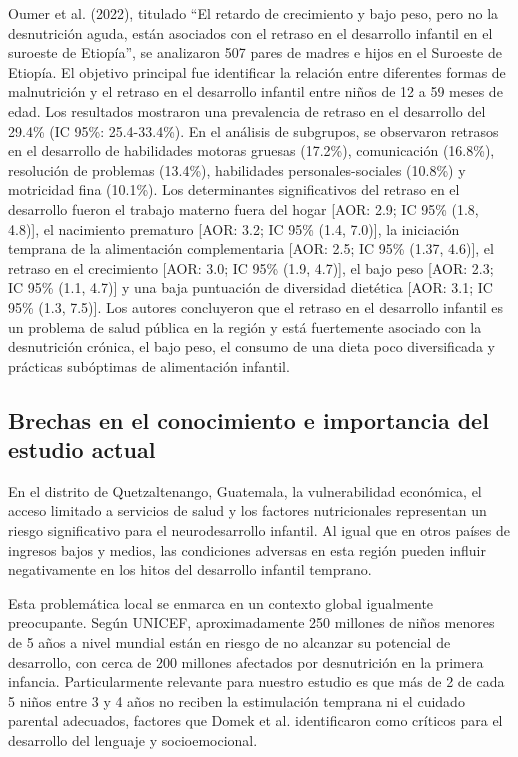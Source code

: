 \documentclass[11pt,letterpaper]{report}
\begin{document}
Oumer et al. (2022), titulado “El retardo de crecimiento y bajo peso, pero no
la desnutrición aguda, están asociados con el retraso en el desarrollo
infantil en el suroeste de Etiopía”, se analizaron 507 pares de madres e hijos
en el Suroeste de Etiopía. El objetivo principal fue identificar la relación
entre diferentes formas de malnutrición y el retraso en el desarrollo infantil
entre niños de 12 a 59 meses de edad. Los resultados mostraron una prevalencia
de retraso en el desarrollo del 29.4\% (IC 95\%: 25.4-33.4\%). En el análisis
de subgrupos, se observaron retrasos en el desarrollo de habilidades motoras
gruesas (17.2\%), comunicación (16.8\%), resolución de problemas (13.4\%),
habilidades personales-sociales (10.8\%) y motricidad fina (10.1\%).
Los determinantes significativos del retraso en el desarrollo fueron el trabajo
materno fuera del hogar [AOR: 2.9; IC 95\% (1.8, 4.8)], el nacimiento prematuro
[AOR: 3.2; IC 95\% (1.4, 7.0)], la iniciación temprana de la alimentación
complementaria [AOR: 2.5; IC 95\% (1.37, 4.6)], el retraso en el crecimiento
[AOR: 3.0; IC 95\% (1.9, 4.7)], el bajo peso [AOR: 2.3; IC 95\% (1.1, 4.7)] y
una baja puntuación de diversidad dietética [AOR: 3.1; IC 95\% (1.3, 7.5)].
Los autores concluyeron que el retraso en el desarrollo infantil es un problema
de salud pública en la región y está fuertemente asociado con la desnutrición
crónica, el bajo peso, el consumo de una dieta poco diversificada y prácticas
subóptimas de alimentación infantil.
\cite{Oumer2022}

\subsection{Brechas en el conocimiento e importancia del estudio actual}
En el distrito de Quetzaltenango, Guatemala, la vulnerabilidad económica, el
acceso limitado a servicios de salud y los factores nutricionales representan
un riesgo significativo para el neurodesarrollo infantil. Al igual que en otros
países de ingresos bajos y medios, las condiciones adversas en esta región
pueden influir negativamente en los hitos del desarrollo infantil temprano.

Esta problemática local se enmarca en un contexto global igualmente 
preocupante. Según UNICEF\cite{UNICEF2023}, aproximadamente 250 millones de 
niños menores de 5 años a nivel mundial están en riesgo de no alcanzar su 
potencial de desarrollo, con cerca de 200 millones afectados por desnutrición 
en la primera infancia. Particularmente relevante para nuestro estudio es que 
más de 2 de cada 5 niños entre 3 y 4 años no reciben la estimulación temprana 
ni el cuidado parental adecuados, factores que Domek et al.\cite{Domek2023} 
identificaron como críticos para el desarrollo del lenguaje y socioemocional. 
\end{document}
